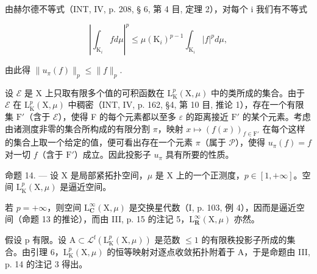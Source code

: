 由赫尔德不等式（INT, IV, p. 208, § 6, 第 4 目, 定理 2），对每个 i 我们有不等式

\[
\left| \int_ {\mathrm{K} _ {i}} f d \mu \right| ^ {p} \leqslant \mu (\mathrm{K} _ {i}) ^ {p - 1} \int_ {\mathrm{K} _ {i}} | f | ^ {p} d \mu ,
\]

由此得 \(\| u_{\pi}(f)\| _p\leqslant \| f\| _p.\)

设 \(\mathcal{E}\) 是 X 上只取有限多个值的可积函数在 \(\mathrm{L}_{\mathrm{K}}^{p}(\mathrm{X},\mu)\) 中的类所成的集合。由于 \(\mathcal{E}\) 在 \(\mathrm{L}_{\mathrm{K}}^{p}(\mathrm{X},\mu)\) 中稠密（INT, IV, p. 162, §4, 第 10 目, 推论 1），存在一个有限集 \(\mathrm{F}'\)（含于 \(\mathcal{E}\)），使得 F 的每个元素都以至多 \(\varepsilon\) 的距离接近 \(\mathrm{F}'\) 的某个元素。考虑由诸测度非零的集合所构成的有限分割 \(\pi\)，映射 \(x\mapsto (f(x))_{f\in \mathrm{F}'}\) 在每个这样的集合上取一个给定的值，便可看出存在一个元素 \(\pi\)（属于 \(\mathcal{P}\)），使得 \(u_{\pi}(f) = f\) 对一切 \(f\)（含于 \(\mathrm{F}'\)）成立。因此投影子 \(u_{\pi}\) 具有所要的性质。

命题 14. --- 设 X 是局部紧拓扑空间，\(\mu\) 是 X 上的一个正测度，\(p \in [1, +\infty]\)。空间 \(\mathrm{L}_{\mathrm{K}}^{p}(\mathrm{X}, \mu)\) 是逼近空间。

若 \(p = +\infty\)，则空间 \(\mathrm{L}_{\mathbf{C}}^{\infty}(\mathrm{X},\mu)\) 是交换星代数（I, p. 103, 例 4），因而是逼近空间（命题 13 的推论），而由 III, p. 15 的注记 5，\(\mathrm{L}_{\mathbf{R}}^{\infty}(\mathrm{X},\mu)\) 亦然。

假设 p 有限。设 \(\mathrm{A}\subset\mathcal{L}^{\mathrm{f}}(\mathrm{L}_{\mathrm{K}}^{p}(\mathrm{X},\mu))\) 是范数 \(\leqslant1\) 的有限秩投影子所成的集合。由引理 6，\(\mathrm{L}_{\mathrm{K}}^{p}(\mathrm{X},\mu)\) 的恒等映射对逐点收敛拓扑附着于 A，于是命题由 III, p. 14 的注记 3 得出。

